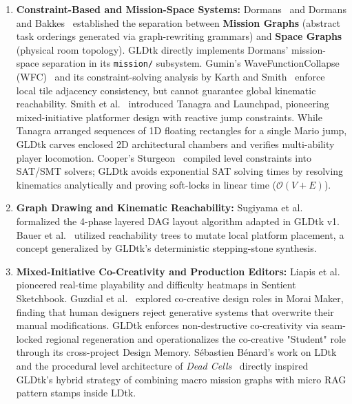 \documentclass[11pt,a4paper]{report}
\theoremstyle{definition}
\theoremstyle{remark}
\begin{document}
\begin{enumerate}
    \item \textbf{Constraint-Based and Mission-Space Systems:} Dormans~\citep{dormans2010adventures} and Dormans and Bakkes~\citep{dormans2011generating} established the separation between \textbf{Mission Graphs} (abstract task orderings generated via graph-rewriting grammars) and \textbf{Space Graphs} (physical room topology). GLDtk directly implements Dormans' mission-space separation in its \texttt{mission/} subsystem. Gumin's WaveFunctionCollapse (WFC)~\citep{gumin2016wave} and its constraint-solving analysis by Karth and Smith~\citep{karth2017wavefunctioncollapse} enforce local tile adjacency consistency, but cannot guarantee global kinematic reachability. Smith et al.~\citep{smith2011tanagra, smith2011launchpad} introduced Tanagra and Launchpad, pioneering mixed-initiative platformer design with reactive jump constraints. While Tanagra arranged sequences of 1D floating rectangles for a single Mario jump, GLDtk carves enclosed 2D architectural chambers and verifies multi-ability player locomotion. Cooper's Sturgeon~\citep{cooper2022sturgeon} compiled level constraints into SAT/SMT solvers; GLDtk avoids exponential SAT solving times by resolving kinematics analytically and proving soft-locks in linear time ($\mathcal{O}(V+E)$).
    
    \item \textbf{Graph Drawing and Kinematic Reachability:} Sugiyama et al.~\citep{sugiyama1981methods} formalized the 4-phase layered DAG layout algorithm adapted in GLDtk v1. Bauer et al.~\citep{bauer2013automated} utilized reachability trees to mutate local platform placement, a concept generalized by GLDtk's deterministic stepping-stone synthesis.
    
    \item \textbf{Mixed-Initiative Co-Creativity and Production Editors:} Liapis et al.~\citep{liapis2013sentient} pioneered real-time playability and difficulty heatmaps in Sentient Sketchbook. Guzdial et al.~\citep{guzdial2019morai} explored co-creative design roles in Morai Maker, finding that human designers reject generative systems that overwrite their manual modifications. GLDtk enforces non-destructive co-creativity via seam-locked regional regeneration and operationalizes the co-creative "Student" role through its cross-project Design Memory. Sébastien Bénard's work on LDtk~\citep{benard2020ldtk} and the procedural level architecture of \emph{Dead Cells}~\citep{benard2017deadcells} directly inspired GLDtk's hybrid strategy of combining macro mission graphs with micro RAG pattern stamps inside LDtk.
\end{enumerate}
\end{document}
